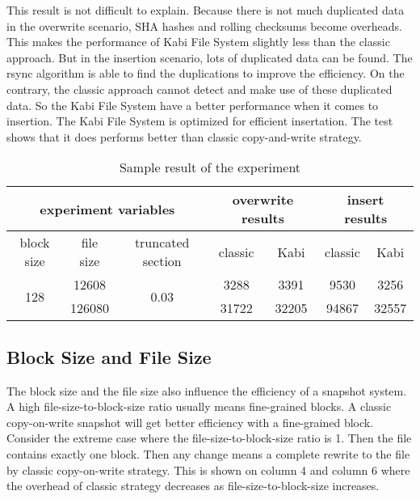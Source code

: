     This result is not difficult to explain. Because there is not much duplicated data in the overwrite scenario, SHA hashes and rolling checksums become overheads. This makes the performance of Kabi File System slightly less than the classic approach. But in the insertion scenario, lots of duplicated data can be found. The rsync algorithm is able to find the duplications to improve the efficiency. On the contrary, the classic approach cannot detect and make use of these duplicated data. So the Kabi File System have a better performance when it comes to insertion. The Kabi File System is optimized for efficient insertation. The test shows that it does performs better than classic copy-and-write strategy.

\begin{table}[t]
\begin{center}
\begin{tabular}{|c|c|c|cccc|}
\hline
\multicolumn{3}{|c|}{experiment variables} & \multicolumn{2}{c|}{overwrite results} & \multicolumn{2}{c|}{insert results}\\
\hline
block size & file size & truncated section & \multicolumn{1}{c|}{classic} & \multicolumn{1}{c|}{Kabi} & \multicolumn{1}{c|}{classic} & Kabi\\
\hline
\multirow{2}{*}{128} & 12608 & \multirow{2}{*}{0.03} & 3288 & 3391 & 9530 & 3256 \\
& 126080 & & 31722 & 32205 & 94867 & 32557 \\
\hline
\end{tabular}
\end{center}
\caption{Sample result of the experiment}
\label{tab:sample_result}
\end{table}

\subsection{Block Size and File Size}

    The block size and the file size also influence the efficiency of a snapshot system. A high file-size-to-block-size ratio usually means fine-grained blocks. A classic copy-on-write snapshot will get better efficiency with a fine-grained block. Consider the extreme case where the file-size-to-block-size ratio is 1. Then the file contains exactly one block. Then any change means a complete rewrite to the file by classic copy-on-write strategy. This is shown on  column 4 and column 6 where the overhead of classic strategy decreases as file-size-to-block-size increases.

